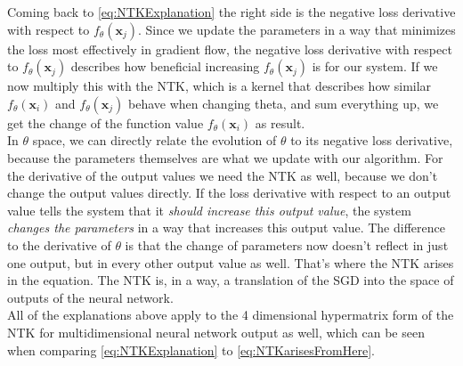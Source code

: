 Coming back to \cref{eq:NTKExplanation} the right side is the negative loss derivative with respect to $f_\theta(\mathbf{x}_j)$. Since we update the parameters in a way that minimizes the loss most effectively in gradient flow, the negative loss derivative with respect to $f_\theta(\mathbf{x}_j)$ describes how beneficial increasing $f_\theta(\mathbf{x}_j)$ is for our system. If we now multiply this with the NTK, which is a kernel that describes how similar $f_\theta(\mathbf{x}_i)$ and $f_\theta(\mathbf{x}_j)$ behave when changing theta, and sum everything up, we get the change of the function value $f_\theta(\mathbf{x}_i)$ as result.\\
In $\theta$ space, we can directly relate the evolution of $\theta$ to its negative loss derivative, because the parameters themselves are what we update with our algorithm. For the derivative of the output values we need the NTK as well, because we don't change the output values directly. If the loss derivative with respect to an output value tells the system that it \textit{should increase this output value}, the system \textit{changes the parameters} in a way that increases this output value. The difference to the derivative of $\theta$ is that the change of parameters now doesn't reflect in just one output, but in every other output value as well. That's where the NTK arises in the equation. The NTK is, in a way, a translation of the SGD into the space of outputs of the neural network.\\
All of the explanations above apply to the 4 dimensional hypermatrix form of the NTK for multidimensional neural network output as well, which can be seen when comparing \cref{eq:NTKExplanation} to \cref{eq:NTKarisesFromHere}.